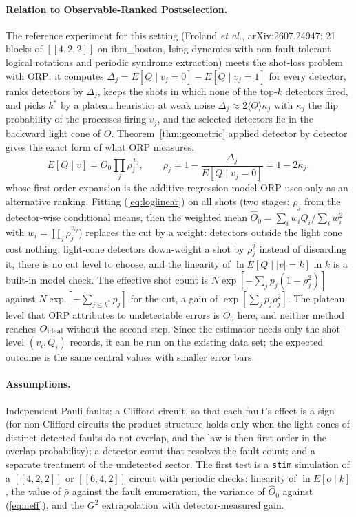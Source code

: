 \documentclass[11pt,a4paper]{article}
\theoremstyle{remark}
\begin{document}
\paragraph{Relation to Observable-Ranked Postselection.} The reference experiment for this setting (Froland \emph{et al.}, arXiv:2607.24947: 21 blocks of $[[4,2,2]]$ on ibm\_boston, Ising dynamics with non-fault-tolerant logical rotations and periodic syndrome extraction) meets the shot-loss problem with ORP: it computes $\Delta_j=E[Q\mid v_j{=}0]-E[Q\mid v_j{=}1]$ for every detector, ranks detectors by $\Delta_j$, keeps the shots in which none of the top-$k$ detectors fired, and picks $k^\ast$ by a plateau heuristic; at weak noise $\Delta_j\approx2\langle O\rangle\kappa_j$ with $\kappa_j$ the flip probability of the processes firing $v_j$, and the selected detectors lie in the backward light cone of $O$. Theorem~\ref{thm:geometric} applied detector by detector gives the exact form of what ORP measures,
\begin{equation}
E[Q\mid v]=O_0\prod_j\rho_j^{\,v_j},\qquad\rho_j=1-\frac{\Delta_j}{E[Q\mid v_j{=}0]}=1-2\kappa_j ,
\label{eq:loglinear}
\end{equation}
whose first-order expansion is the additive regression model ORP uses only as an alternative ranking. Fitting (\ref{eq:loglinear}) on all shots (two stages: $\rho_j$ from the detector-wise conditional means, then the weighted mean $\hat O_0=\sum_iw_iQ_i/\sum_iw_i^2$ with $w_i=\prod_j\rho_j^{v_{ij}}$) replaces the cut by a weight: detectors outside the light cone cost nothing, light-cone detectors down-weight a shot by $\rho_j^2$ instead of discarding it, there is no cut level to choose, and the linearity of $\ln E[Q\mid |v|{=}k]$ in $k$ is a built-in model check. The effective shot count is $N\exp[-\sum_jp_j(1-\rho_j^2)]$ against $N\exp[-\sum_{j\le k^\ast}p_j]$ for the cut, a gain of $\exp[\sum_jp_j\rho_j^2]$. The plateau level that ORP attributes to undetectable errors is $O_0$ here, and neither method reaches $O_{\rm ideal}$ without the second step. Since the estimator needs only the shot-level $(v_i,Q_i)$ records, it can be run on the existing data set; the expected outcome is the same central values with smaller error bars.

\paragraph{Assumptions.} Independent Pauli faults; a Clifford circuit, so that each fault's effect is a sign (for non-Clifford circuits the product structure holds only when the light cones of distinct detected faults do not overlap, and the law is then first order in the overlap probability); a detector count that resolves the fault count; and a separate treatment of the undetected sector. The first test is a \texttt{stim} simulation of a $[[4,2,2]]$ or $[[6,4,2]]$ circuit with periodic checks: linearity of $\ln E[o\mid k]$, the value of $\bar\rho$ against the fault enumeration, the variance of $\hat O_0$ against (\ref{eq:neff}), and the $G^2$ extrapolation with detector-measured gain.
\end{document}
